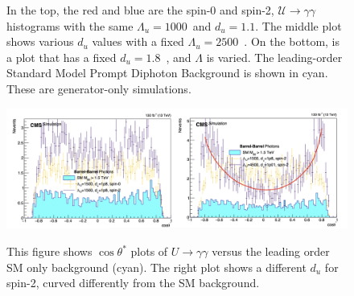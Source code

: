 \begin{figure}[!htbp]
	\caption{
  In the top, the red and blue are the spin-0 and spin-2, $\mathcal{U}\rightarrow \gamma\gamma$ histograms with the same $\Lambda_u = 1000$~\GeV and $d_{u} = 1.1$.
 The middle plot shows various $d_u$ values with a fixed $\Lambda_u = 2500$~\GeV. On the bottom, is a plot that has a fixed $d_u = 1.8$~\GeV, and $\Lambda$ is varied. The leading-order Standard Model Prompt Diphoton Background is shown in cyan. These are generator-only simulations.}
	\label{fig:UnparHistogSensitivity}
\end{figure}

\begin{figure}[!htbp]
	\centering
    \includegraphics[scale=0.4]{fig/cosThetaStar.png}
	\label{fig:UnparCosThetaStar}
 \caption{This figure shows $\cos \theta^*$ plots of $U\rightarrow \gamma\gamma$ versus the leading order SM only background (cyan). The right plot shows a different $d_u$ for spin-2, curved differently from the SM background.}
\end{figure}


    

